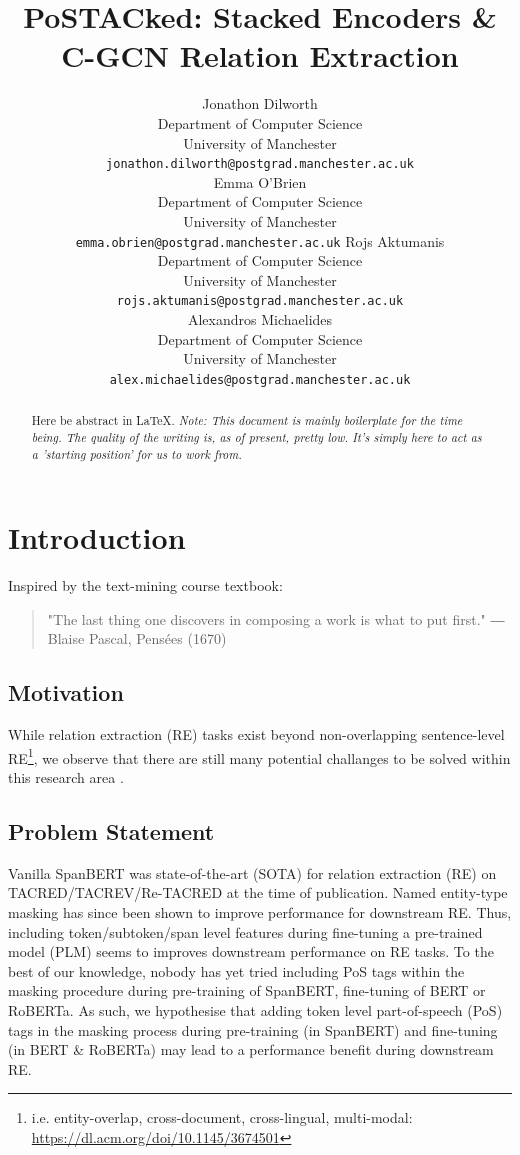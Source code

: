 \documentclass[11pt]{article}
\title{PoSTACked: Stacked Encoders \& C-GCN Relation Extraction}
\author{Jonathon Dilworth \orcidlink{0009-0009-0260-0492} \\ 
        Department of Computer Science \\
        University of Manchester \\
        \texttt{\small{jonathon.dilworth@postgrad.manchester.ac.uk}} \\\And
        Emma O'Brien \\
        Department of Computer Science \\
        University of Manchester \\
        \texttt{\small{emma.obrien@postgrad.manchester.ac.uk}}
        \AND
        Rojs Aktumanis \\
        Department of Computer Science \\ 
        University of Manchester \\
        \texttt{\small{rojs.aktumanis@postgrad.manchester.ac.uk}} \\\And
        Alexandros Michaelides \orcidlink{0009-0004-8430-8930} \\
        Department of Computer Science \\ 
        University of Manchester \\
        \texttt{\small{alex.michaelides@postgrad.manchester.ac.uk}}}
\begin{document}
\maketitle

\begin{abstract}
Here be abstract in \LaTeX. \emph{Note: This document is mainly boilerplate for the time being. The quality of the writing is, as of present, pretty low. It's simply here to act as a 'starting position' for us to work from.}
\end{abstract}

\section{Introduction}

Inspired by the text-mining course textbook\cite{a-2022-automating}:

\begin{quote}
"The last thing one discovers in composing a work is what to put first."
― Blaise Pascal, Pensées (1670)
\end{quote}

\subsection{Motivation}

While relation extraction (RE) tasks exist beyond non-overlapping sentence-level RE\footnote{i.e. entity-overlap, cross-document, cross-lingual, multi-modal: \url{https://dl.acm.org/doi/10.1145/3674501}}, we observe that there are still many potential challanges to be solved within this research area \cite{zhou-chen-2022-improved}. 

\subsection{Problem Statement}

Vanilla SpanBERT was state-of-the-art (SOTA) for relation extraction (RE) on TACRED/TACREV/Re-TACRED at the time of publication. Named entity-type masking has since been shown to improve performance for downstream RE. Thus, including token/subtoken/span level features during fine-tuning a pre-trained model (PLM) seems to improves downstream performance on RE tasks. To the best of our knowledge, nobody has yet tried including PoS tags within the masking procedure during pre-training of SpanBERT, fine-tuning of BERT or RoBERTa. As such, we hypothesise that adding token level part-of-speech (PoS) tags in the masking process during pre-training (in SpanBERT) and fine-tuning (in BERT \& RoBERTa) may lead to a performance benefit during downstream RE.
\end{document}
